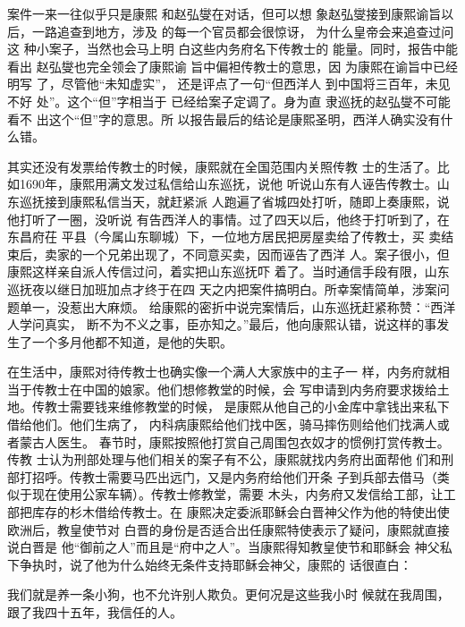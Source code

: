 案件一来一往似乎只是康熙%
和赵弘燮在对话，但可以想%
象赵弘燮接到康熙谕旨以%
后，一路追查到地方，涉及%
的每一个官员都会很惊讶，%
为什么皇帝会来追查过问这%
种小案子，当然也会马上明%
白这些内务府名下传教士的%
能量。同时，报告中能看出%
赵弘燮也完全领会了康熙谕%
旨中偏袒传教士的意思，因%
为康熙在谕旨中已经明写%
了，尽管他“未知虚实”，%
还是评点了一句“但西洋人%
到中国将三百年，未见不好%
处”。这个“但”字相当于%
已经给案子定调了。身为直%
隶巡抚的赵弘燮不可能看不%
出这个“但”字的意思。所%
以报告最后的结论是康熙圣明，西洋人确实没有什么错。%
\par
其实还没有发票给传教士的时候，康熙就在全国范围内关照传教%
士的生活了。比如1690年，康熙用满文发过私信给山东巡抚，说他%
听说山东有人诬告传教士。山东巡抚接到康熙私信当天，就赶紧派%
人跑遍了省城四处打听，随即上奏康熙，说他打听了一圈，没听说%
有告西洋人的事情。过了四天以后，他终于打听到了，在东昌府茌%
平县（今属山东聊城）下，一位地方居民把房屋卖给了传教士，买%
卖结束后，卖家的一个兄弟出现了，不同意买卖，因而诬告了西洋%
人。案子很小，但康熙这样亲自派人传信过问，着实把山东巡抚吓%
着了。当时通信手段有限，山东巡抚夜以继日加班加点才终于在四%
天之内把案件搞明白。所幸案情简单，涉案问题单一，没惹出大麻烦。%
给康熙的密折中说完案情后，山东巡抚赶紧称赞：“西洋人学问真实，%
断不为不义之事，臣亦知之。”最后，他向康熙认错，说这样的事发%
生了一个多月他都不知道，是他的失职。%
\par
在生活中，康熙对待传教士也确实像一个满人大家族中的主子一%
样，内务府就相当于传教士在中国的娘家。他们想修教堂的时候，会%
写申请到内务府要求拨给土地。传教士需要钱来维修教堂的时候，%
是康熙从他自己的小金库中拿钱出来私下借给他们。他们生病了，%
内科病康熙给他们找中医，骑马摔伤则给他们找满人或者蒙古人医生。%
春节时，康熙按照他打赏自己周围包衣奴才的惯例打赏传教士。传教%
士认为刑部处理与他们相关的案子有不公，康熙就找内务府出面帮他%
们和刑部打招呼。传教士需要马匹出远门，又是内务府给他们开条%
子到兵部去借马（类似于现在使用公家车辆）。传教士修教堂，需要%
木头，内务府又发信给工部，让工部把库存的杉木借给传教士。在%
康熙决定委派耶稣会白晋神父作为他的特使出使欧洲后，教皇使节对%
白晋的身份是否适合出任康熙特使表示了疑问，康熙就直接说白晋是%
他“御前之人”而且是“府中之人”。当康熙得知教皇使节和耶稣会%
神父私下争执时，说了他为什么始终无条件支持耶稣会神父，康熙的%
话很直白：%
\par
{\bookkai 我们就是养一条小狗，也不允许别人欺负。更何况是这些我小时}%
{\bookkai 候就在我周围，跟了我四十五年，我信任的人。}%
